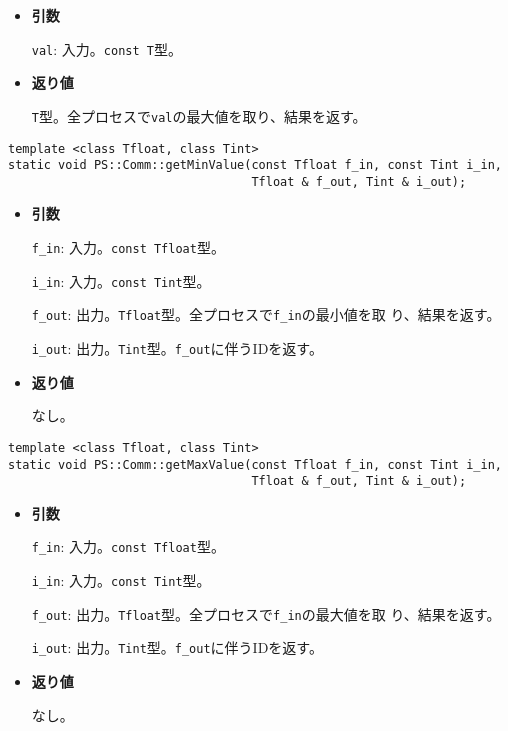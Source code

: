 \begin{itemize}

\item{{\bf 引数}}

{\tt val}: 入力。{\tt const T}型。

\item{{\bf 返り値}}

{\tt T}型。全プロセスで{\tt val}の最大値を取り、結果を返す。

\end{itemize}

\begin{screen}
\begin{verbatim}
template <class Tfloat, class Tint>
static void PS::Comm::getMinValue(const Tfloat f_in, const Tint i_in,
                                  Tfloat & f_out, Tint & i_out);
\end{verbatim}
\end{screen}

\begin{itemize}

\item{{\bf 引数}}

{\tt f\_in}: 入力。{\tt const Tfloat}型。

{\tt i\_in}: 入力。{\tt const Tint}型。

{\tt f\_out}: 出力。{\tt Tfloat}型。全プロセスで{\tt f\_in}の最小値を取
り、結果を返す。

{\tt i\_out}: 出力。{\tt Tint}型。{\tt f\_out}に伴うIDを返す。

\item{{\bf 返り値}}

なし。

\end{itemize}

\begin{screen}
\begin{verbatim}
template <class Tfloat, class Tint>
static void PS::Comm::getMaxValue(const Tfloat f_in, const Tint i_in,
                                  Tfloat & f_out, Tint & i_out);
\end{verbatim}
\end{screen}

\begin{itemize}

\item{{\bf 引数}}

{\tt f\_in}: 入力。{\tt const Tfloat}型。

{\tt i\_in}: 入力。{\tt const Tint}型。

{\tt f\_out}: 出力。{\tt Tfloat}型。全プロセスで{\tt f\_in}の最大値を取
り、結果を返す。

{\tt i\_out}: 出力。{\tt Tint}型。{\tt f\_out}に伴うIDを返す。

\item{{\bf 返り値}}

なし。

\end{itemize}

